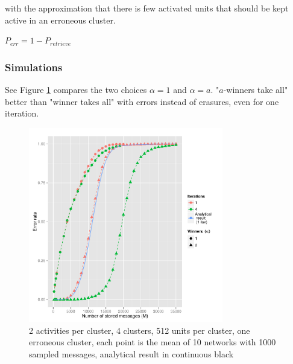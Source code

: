 \documentclass[english,10pt,twocolumn]{IEEEtran}
\theoremstyle{definition}
\begin{document}
	with the approximation that there is few activated units that should be kept active in an erroneous cluster.

	
	$P_{err} = 1 - P_{retrieve}$	

	
	
	\subsubsection{Simulations}
	See Figure \ref{corruptth} compares the two choices $\alpha = 1$ and $\alpha = a$.
	"$a$-winners take all" better than "winner takes all" with errors instead of erasures, even for one iteration.
	
	\begin{figure}[!htb]
		\includegraphics[width=8.5cm]{Courbes/fig4c4l512a2e1corr}%
		\caption{2 activities per cluster, 4 clusters, 512 units per cluster, one erroneous cluster, each point is the mean of 10 networks with 1000 sampled messages, analytical result in continuous black}
		\label{corruptth}
	\end{figure}
		
\end{document}
